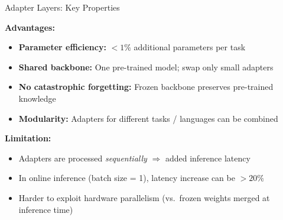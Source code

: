 \documentclass[11pt,compress,t,notes=noshow, xcolor=table]{beamer}
\begin{document}
\begin{frame}{Adapter Layers: Key Properties}

\vfill

\textbf{Advantages:}
\begin{itemize}
  \item \textbf{Parameter efficiency:} $< 1\%$ additional parameters per task
  \item \textbf{Shared backbone:} One pre-trained model; swap only small adapters
  \item \textbf{No catastrophic forgetting:} Frozen backbone preserves pre-trained knowledge
  \item \textbf{Modularity:} Adapters for different tasks / languages can be combined
\end{itemize}

\vfill

\textbf{Limitation:}
\begin{itemize}
  \item Adapters are processed \textit{sequentially} $\Rightarrow$ added inference latency
  \item In online inference (batch size = 1), latency increase can be $> 20\%$ 
  \item Harder to exploit hardware parallelism (vs.\ frozen weights merged at inference time)
\end{itemize}

\vfill

\end{frame}

\end{document}
